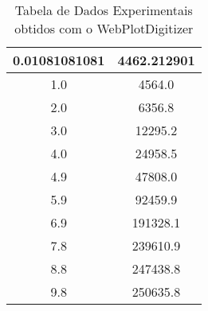 \begin{table}[h]
\centering
\caption{Tabela de Dados Experimentais obtidos com o WebPlotDigitizer}
\label{tab:ex1_data}
\begin{tabular}{cc}
\toprule
0.01081081081 &  4462.212901 \\
\midrule
1.0 & 4564.0 \\
2.0 & 6356.8 \\
3.0 & 12295.2 \\
4.0 & 24958.5 \\
4.9 & 47808.0 \\
5.9 & 92459.9 \\
6.9 & 191328.1 \\
7.8 & 239610.9 \\
8.8 & 247438.8 \\
9.8 & 250635.8 \\
\bottomrule
\end{tabular}
\end{table}